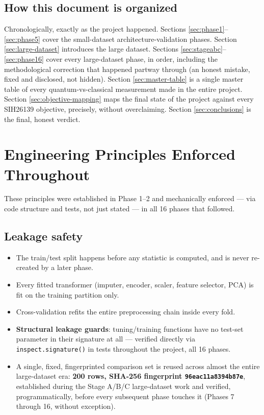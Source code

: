 \documentclass[11pt,a4paper]{article}
\newcommand{\code}[1]{\texttt{\small #1}}
\begin{document}
\subsection{How this document is organized}

Chronologically, exactly as the project happened. Sections \ref{sec:phase1}--\ref{sec:phase5} cover the small-dataset architecture-validation phases. Section \ref{sec:large-dataset} introduces the large dataset. Sections \ref{sec:stageabc}--\ref{sec:phase16} cover every large-dataset phase, in order, including the methodological correction that happened partway through (an honest mistake, fixed and disclosed, not hidden). Section \ref{sec:master-table} is a single master table of every quantum-vs-classical measurement made in the entire project. Section \ref{sec:objective-mapping} maps the final state of the project against every SIH26139 objective, precisely, without overclaiming. Section \ref{sec:conclusions} is the final, honest verdict.

\section{Engineering Principles Enforced Throughout}
\label{sec:principles}

These principles were established in Phase 1--2 and mechanically enforced --- via code structure and tests, not just stated --- in all 16 phases that followed.

\subsection{Leakage safety}
\begin{itemize}[leftmargin=1.4em]
  \item The train/test split happens before any statistic is computed, and is never re-created by a later phase.
  \item Every fitted transformer (imputer, encoder, scaler, feature selector, PCA) is fit on the training partition only.
  \item Cross-validation refits the entire preprocessing chain inside every fold.
  \item \textbf{Structural leakage guards}: tuning/training functions have no test-set parameter in their signature at all --- verified directly via \code{inspect.signature()} in tests throughout the project, all 16 phases.
  \item A single, fixed, fingerprinted comparison set is reused across almost the entire large-dataset era: \textbf{200 rows, SHA-256 fingerprint \code{96eac11a8394b87e}}, established during the Stage A/B/C large-dataset work and verified, programmatically, before every subsequent phase touches it (Phases 7 through 16, without exception).
\end{itemize}
\end{document}

